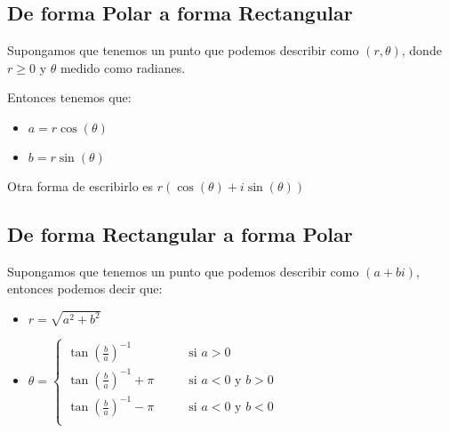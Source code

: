 \documentclass[12pt, fleqn]{report}                             %
\DeclareMathOperator \Space {\quad}                             %
\newcommand{\Wrap}[1]{\left( #1 \right)}                        %
\newcommand{\Cos}[1]{\cos\Wrap{#1}}
\newcommand{\Sin}[1]{\sin\Wrap{#1}}
\begin{document}
            \subsection{De forma Polar a forma Rectangular}

                Supongamos que tenemos un punto que podemos describir como $(r, \theta)$,
                donde $r \geq 0$ y $\theta$ medido como radianes.

                Entonces tenemos que:

                \begin{itemize}
                     \item $a = r \Cos{\theta}$
                     \item $b = r \Sin{\theta}$
                 \end{itemize}

                 Otra forma de escribirlo es $r(\Cos{\theta} + i\Sin{\theta})$

            \subsection{De forma Rectangular a forma Polar}

                Supongamos que tenemos un punto que podemos describir como $(a+bi)$,
                entonces podemos decir que:

                \begin{itemize}
                    \item $r = \sqrt{a^2+b^2}$
                    \item $\theta = \begin{cases}
                                        \tan(\frac{b}{a})^{-1}      \Space &\text{ si } a > 0                   \\
                                        \tan(\frac{b}{a})^{-1} +\pi \Space &\text{ si } a < 0 \text{ y } b > 0  \\
                                        \tan(\frac{b}{a})^{-1} -\pi \Space &\text{ si } a < 0 \text{ y } b < 0  \\
                                    \end{cases}$
                \end{itemize}
\end{document}
